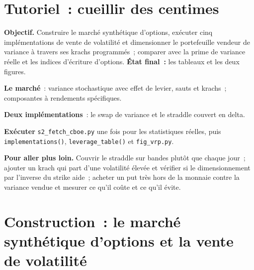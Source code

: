 \section{Tutoriel~: cueillir des centimes}\label{tut:s2:harvesting-the-variance-risk-premium:tut}

\begin{tutorial}
\textbf{Objectif.} Construire le marché synthétique d'options, exécuter cinq implémentations de vente de volatilité et dimensionner le portefeuille vendeur de variance à travers ses
krachs programmés~; comparer avec la prime de variance réelle et les indices d'écriture d'options. \textbf{État final~:} les tableaux et les deux figures.
\begin{tutsteps}
\item \textbf{Le marché}~: variance stochastique avec effet de levier, sauts et krachs~; composantes à rendements spécifiques.
\label{lst:s2:harvesting-the-variance-risk-premium:synthvol}
\item \textbf{Deux implémentations}~: le swap de variance et le straddle couvert en delta.
\label{lst:s2:harvesting-the-variance-risk-premium:shortvol}
\item \textbf{Exécuter} \texttt{s2\_fetch\_cboe.py} une fois pour les statistiques réelles, puis \texttt{implementations()}, \texttt{leverage\_table()} et
\texttt{fig\_vrp.py}.
\end{tutsteps}
\textbf{Pour aller plus loin.} Couvrir le straddle sur bandes plutôt que chaque jour~; ajouter un krach qui part d'une volatilité élevée et vérifier si le dimensionnement
par l'inverse du strike aide~; acheter un put très hors de la monnaie contre la variance vendue et mesurer ce qu'il coûte et ce qu'il évite.
\end{tutorial}

\section{Construction~: le marché synthétique d'options et la vente de volatilité}\label{bld:s2:harvesting-the-variance-risk-premium:shortvol}

